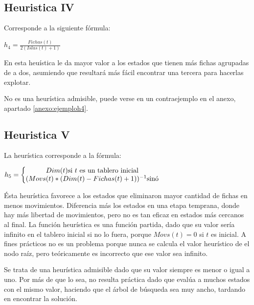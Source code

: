 \documentclass[%
    final,
    reprint,
    notitlepage,
    narroweqnarray,
    inline,
    twoside,
    invited
    ]{ieee}
\begin{document}
\subsection{Heuristica IV}
Corresponde a la siguiente f\'ormula:\\

\begin{center}
\begin{math}
h_4=\frac{Fichas(t)}{2(Islas(t)+1)}
\end{math}\\
\end{center}

\par En esta heu\'istica le da mayor valor a los estados que tienen m\'as fichas agrupadas de a dos, asumiendo que resultar\'a m\'as f\'acil encontrar una tercera para hacerlas explotar.\\
\par No es una heur\'istica admisible, puede verse en un contraejemplo en el anexo, apartado \ref{anexo:ejemploh4}.

\subsection{Heuristica V}
La heur\'istica corresponde a la f\'ormula:\\

\begin{center}
\begin{math}
h_5=\left\{\begin{matrix}
             Dim(t) $si  $t$ es un tablero inicial$ \\
             (Movs(t)*(Dim(t)-Fichas(t)+1))^{-1} $sin\'o$
             \end{matrix}
   \right.
\end{math}\\
\end{center}

\par \'Esta heur\'istica favorece a los estados que eliminaron mayor cantidad de fichas en menos movimientos. Diferencia m\'as los estados en una etapa temprana, donde hay m\'as libertad de movimientos, pero no es tan eficaz en estados m\'as cercanos al final. La funci\'on heur\'istica es una funci\'on partida, dado que su valor ser\'ia infinito en el tablero inicial si no lo fuera, porque $Movs(t)=0$ si $t$ es inicial. A fines pr\'acticos no es un problema porque nunca se calcula el valor heur\'istico de el nodo ra\'iz, pero te\'oricamente es incorrecto que ese valor sea infinito.\\
\par Se trata de una heur\'istica admisible dado que su valor siempre es menor o igual a uno. Por m\'as de que lo sea, no resulta pr\'actica dado que eval\'ua a muchos estados con el mismo valor, haciendo que el \'arbol de b\'usqueda sea muy ancho, tardando en encontrar la soluci\'on.
\end{document}
